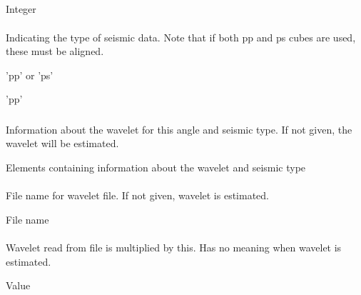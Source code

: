 \subparagraph{}
 \slist
   \item \Description 
   \item \Argument Integer
   \item \Default
 \elist

\paragraph{}
 \slist
   \item \Description Indicating the type of seismic data. Note that if both pp and ps cubes are used, these must be aligned.
   \item \Argument 'pp' or 'ps'
   \item \Default 'pp'
 \elist

\subsubsection{}
 \slist
   \item \Description Information about the wavelet for this angle and seismic type. If not given, the wavelet will be estimated.
   \item \Argument Elements containing information about the wavelet and seismic type
   \item \Default
 \elist

\paragraph{}
 \slist
   \item \Description File name for wavelet file. If not given, wavelet is estimated.
   \item \Argument File name
   \item \Default
 \elist

\paragraph{}
 \slist
   \item \Description Wavelet read from file is multiplied by this. Has no meaning when wavelet is estimated.
   \item \Argument Value
   \item \Default
 \elist

